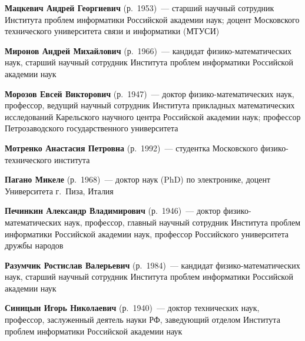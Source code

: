 \begin{multicols}{2}
 \vspace*{2pt}

 \noindent
\textbf{Мацкевич Андрей Георгиевич} (р.\ 1953)~---
старший научный сотрудник Института проблем информатики Российской академии наук;
доцент Московского технического университета связи и информатики (МТУСИ)

\vspace*{2pt}

 \noindent
\textbf{Миронов Андрей Михайлович} (р.\ 1966)~---
кандидат фи\-зи\-ко-ма\-те\-ма\-ти\-че\-ских наук, старший научный
сотрудник Института проблем информатики Российской академии наук

\vspace*{2pt}

\noindent
\textbf{Морозов Евсей Викторович} (р.\ 1947)~---
доктор фи\-зи\-ко-ма\-те\-ма\-ти\-че\-ских наук, профессор, ведущий научный
сотрудник Института прикладных математических исследований Карельского
научного центра Российской академии наук; профессор Петрозаводского
государственного университета

\vspace*{2pt}

\noindent
\textbf{Мотренко Анастасия Петровна} (р.\ 1992)~---
студентка Московского фи\-зи\-ко-тех\-ни\-че\-ско\-го института

\vspace*{2pt}

\noindent
\textbf{Пагано Микеле} (р.\ 1968)~---
доктор наук (PhD) по электронике, доцент Университета г.~Пиза, Италия

\vspace*{2pt}


\noindent
\textbf{Печинкин Александр Владимирович} (р.\ 1946)~---
доктор физико-математических наук, профессор,
главный научный сотрудник Института проблем информатики
Российской академии наук, профессор
Российского университета дружбы народов


\noindent
\textbf{Разумчик Ростислав Валерьевич} (р.\ 1984)~---
кандидат фи\-зи\-ко-ма\-те\-ма\-ти\-че\-ских наук,
старший научный сотрудник Института проблем информатики
Российской академии наук

\columnbreak

\noindent
\textbf{Синицын Игорь Николаевич} (р.\ 1940)~--- доктор технических наук,
профессор, заслуженный деятель
 науки РФ, заведующий отделом Института проб\-лем информатики
Российской академии наук

\vspace*{2pt}


\end{multicols}
